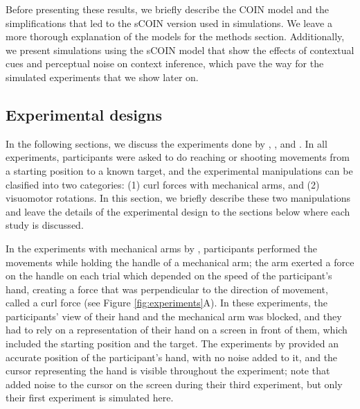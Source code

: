 \documentclass[a4paper,doc,floatsintext,natbib]{apa6}
\def \fref #1{Figure \ref{#1}}     %
\begin{document}
Before presenting these results, we briefly describe the COIN model and the simplifications that led to the sCOIN version used in simulations. We leave a more thorough explanation of the models for the methods section. Additionally, we present simulations using the sCOIN model that show the effects of contextual cues and perceptual noise on context inference, which pave the way for the simulated experiments that we show later on.


\subsection{Experimental designs}
In the following sections, we discuss the experiments done by \cite{Kim_Neural_2015}, \cite{Oh_Minimizing_2019}, \cite{Davidson_Scaling_2004} and \cite{Vaswani_Decay_2013}. In all experiments, participants were asked to do reaching or shooting movements from a starting position to a known target, and the experimental manipulations can be clasified into two categories: (1) curl forces with mechanical arms, and (2) visuomotor rotations. In this section, we briefly describe these two manipulations and leave the details of the experimental design to the sections below where each study is discussed.

In the experiments with mechanical arms by \cite{Davidson_Scaling_2004,Vaswani_Decay_2013}, participants performed the movements while holding the handle of a mechanical arm; the arm exerted a force on the handle on each trial which depended on the speed of the participant's hand, creating a force that was perpendicular to the direction of movement, called a curl force (see \fref{fig:experiments}A). In these experiments, the participants' view of their hand and the mechanical arm was blocked, and they had to rely on a representation of their hand on a screen in front of them, which included the starting position and the target. The experiments by \cite{Davidson_Scaling_2004,Vaswani_Decay_2013} provided an accurate position of the participant's hand, with no noise added to it, and the cursor representing the hand is visible throughout the experiment; note that \cite{Vaswani_Decay_2013} added noise to the cursor on the screen during their third experiment, but only their first experiment is simulated here.
\end{document}
